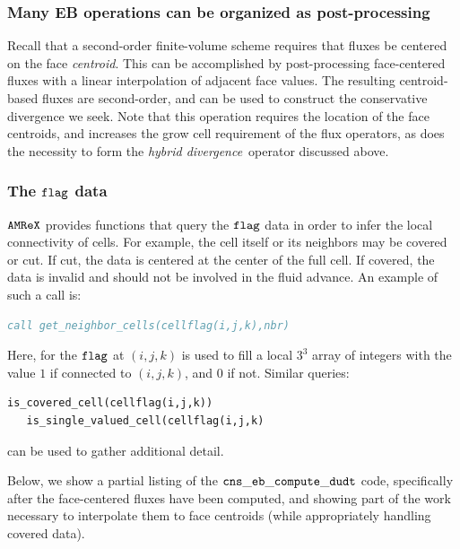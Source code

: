 \subsubsection{Many EB operations can be organized as post-processing}
Recall that a second-order finite-volume scheme requires that fluxes
be centered on the face {\em centroid}.  This can be accomplished by post-processing face-centered fluxes with a linear interpolation
of adjacent face values.  The resulting centroid-based fluxes are second-order, and can be used to construct the conservative
divergence we seek.  Note that this operation requires the location of the face centroids, and increases the grow cell requirement
of the flux operators, as does the necessity to form the {\em hybrid divergence}\ operator discussed above.

\subsubsection{The $\tt{flag}$ data}
$\tt{AMReX}$ provides functions that query the $\tt{flag}$ data in order to infer the local connectivity of cells.  For example,
the cell itself or its neighbors may be covered or cut.  If cut, the data is centered at the center of the full cell.  If covered,
the data is invalid and should not be involved in the fluid advance.  An example of such a call is:

\begin{lstlisting}[language=Fortran]
   call get_neighbor_cells(cellflag(i,j,k),nbr)
\end{lstlisting}

Here, for the $\tt{flag}$ at $(i,j,k)$ is used to fill a local $3^3$ array of integers with the value $1$ if connected to $(i,j,k)$,
and $0$ if not.  Similar queries:

\begin{lstlisting}[language=Fortran]
   is_covered_cell(cellflag(i,j,k))
   is_single_valued_cell(cellflag(i,j,k)
\end{lstlisting}
can be used to gather additional detail.

Below, we show a partial listing of the $\tt{cns\_eb\_compute\_dudt}$ code, specifically after the face-centered fluxes have been computed,
and showing part of the work necessary to interpolate them to face centroids (while appropriately handling covered data).

